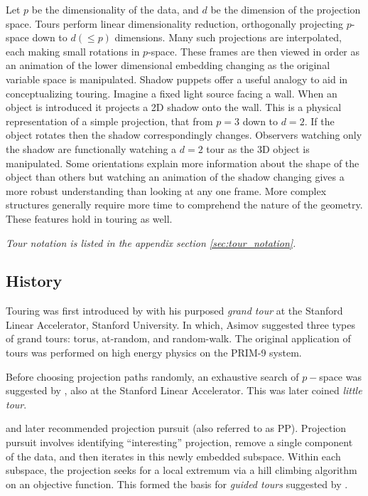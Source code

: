 \documentclass{monashthesis}
\begin{document}
Let \(p\) be the dimensionality of the data, and \(d\) be the dimension
of the projection space. Tours perform linear dimensionality reduction,
orthogonally projecting \(p\)-space down to \(d(\leq p)\) dimensions.
Many such projections are interpolated, each making small rotations in
\(p\)-space. These frames are then viewed in order as an animation of
the lower dimensional embedding changing as the original variable space
is manipulated. Shadow puppets offer a useful analogy to aid in
conceptualizing touring. Imagine a fixed light source facing a wall.
When an object is introduced it projects a 2D shadow onto the wall. This
is a physical representation of a simple projection, that from \(p=3\)
down to \(d=2\). If the object rotates then the shadow correspondingly
changes. Observers watching only the shadow are functionally watching a
\(d=2\) tour as the 3D object is manipulated. Some orientations explain
more information about the shape of the object than others but watching
an animation of the shadow changing gives a more robust understanding
than looking at any one frame. More complex structures generally require
more time to comprehend the nature of the geometry. These features hold
in touring as well.

\emph{Tour notation is listed in the appendix section
\ref{sec:tour_notation}.}

\subsection{History}\label{history}

Touring was first introduced by \textcite{asimov_grand_1985} with his
purposed \emph{grand tour} at the Stanford Linear Accelerator, Stanford
University. In which, Asimov suggested three types of grand tours:
torus, at-random, and random-walk. The original application of tours was
performed on high energy physics on the PRIM-9 system.

Before choosing projection paths randomly, an exhaustive search of
\(p-\)space was suggested by \textcite{mcdonald_interactive_1982}, also
at the Stanford Linear Accelerator. This was later coined \emph{little
tour}.

\textcite{friedman_projection_1974} and later
\textcite{huber_projection_1985} recommended projection pursuit (also
referred to as PP). Projection pursuit involves identifying
``interesting'' projection, remove a single component of the data, and
then iterates in this newly embedded subspace. Within each subspace, the
projection seeks for a local extremum via a hill climbing algorithm on
an objective function. This formed the basis for \emph{guided tours}
suggested by \textcite{hurley_analyzing_1990}.
\end{document}
